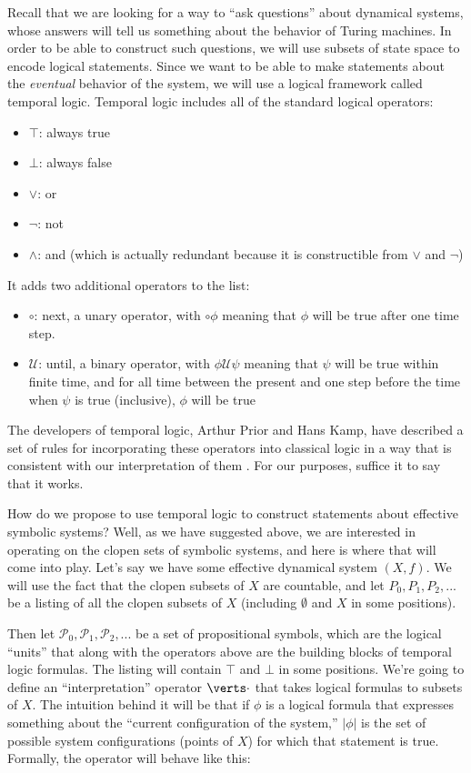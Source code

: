 \documentclass{fkpaper}
\newcommand{\lnext}{\circ}
\newcommand{\ltil}{\mathcal{U}}
\newcommand{\psc}{\mathcal{P}}
\begin{document}
\begin{multicols}{2}
Recall that we are looking for a way to ``ask questions'' about dynamical systems, whose answers will tell us something about the behavior of Turing machines. In order to be able to construct such questions, we will use subsets of state space to encode logical statements. Since we want to be able to make statements about the {\it eventual} behavior of the system, we will use a logical framework called temporal logic. Temporal logic includes all of the standard logical operators:
\begin{itemize}
  \item $\top$: always true
  \item $\bot$: always false
  \item $\lor$: or
  \item $\lnot$: not
  \item $\land$: and (which is actually redundant because it is constructible from $\lor$ and $\lnot$)
\end{itemize}
It adds two additional operators to the list:
\begin{itemize}
  \item $\lnext$: next, a unary operator, with $\lnext \phi$ meaning that $\phi$ will be true after one time step.
  \item $\ltil$: until, a binary operator, with $\phi \ltil \psi$ meaning that $\psi$ will be true within finite time, and for all time between the present and one step before the time when $\psi$ is true (inclusive), $\phi$ will be true
\end{itemize}

The developers of temporal logic, Arthur Prior and Hans Kamp, have described a set of rules for incorporating these operators into classical logic in a way that is consistent with our interpretation of them \cite{Delvenne2004Apr}. For our purposes, suffice it to say that it works.

How do we propose to use temporal logic to construct statements about effective symbolic systems? Well, as we have suggested above, we are interested in operating on the clopen sets of symbolic systems, and here is where that will come into play. Let's say we have some effective dynamical system $(X, f)$. We will use the fact that the clopen subsets of $X$ are countable, and let $P_0, P_1, P_2, ...$ be a listing of all the clopen subsets of $X$ (including $\emptyset$ and $X$ in some positions).

Then let $\psc_0, \psc_1, \psc_2, ...$ be a set of propositional symbols, which are the logical ``units'' that along with the operators above are the building blocks of temporal logic formulas. The listing will contain $\top$ and $\bot$ in some positions. We're going to define an ``interpretation'' operator $\abs{\cdot}$ that takes logical formulas to subsets of $X$. The intuition behind it will be that if $\phi$ is a logical formula that expresses something about the ``current configuration of the system,'' $|\phi|$ is the set of possible system configurations (points of $X$) for which that statement is true. Formally, the operator will behave like this:


\end{multicols}
\end{document}
